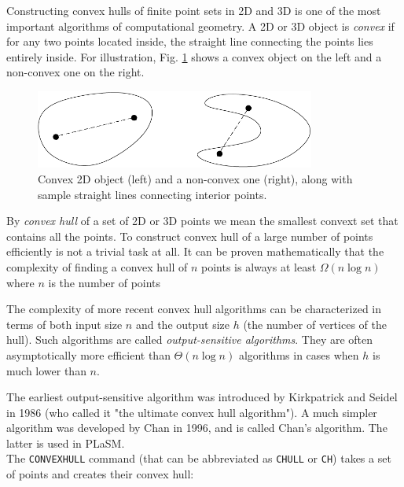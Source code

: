 Constructing convex hulls of finite point sets in 2D and 3D is one of the 
most important algorithms of computational geometry. A 2D or 3D object is {\em convex} if for any 
two points located inside, the straight line connecting the points 
lies entirely inside. For illustration, Fig. \ref{fig:convex} 
shows a convex object on the left and a non-convex one on the right.

\begin{figure}[!ht]
\begin{center}
\includegraphics[width=0.82\textwidth]{img/convex.pdf}
\end{center}
\vspace{-4mm}
\caption{Convex 2D object (left) and a non-convex one (right), along with 
         sample straight lines connecting interior points.}
\label{fig:convex}
\end{figure}
\noindent
By {\em convex hull} of a set of 2D or 3D points we mean the smallest convext 
set that contains all the points. To construct convex hull of a large number 
of points efficiently is not a trivial task at all. It can be proven 
mathematically that the complexity of finding a convex hull of $n$ points 
is always at least $Ω(n \log n)$ where $n$ is the number of points 
 
The complexity of more recent convex hull algorithms can be characterized 
in terms of both input size $n$ and the output size $h$ (the number of vertices
of the hull). Such algorithms are called {\em output-sensitive algorithms}. 
They are often asymptotically more efficient than $Θ(n \log n)$ algorithms 
in cases when $h$ is much lower than $n$. 

The earliest output-sensitive 
algorithm was introduced by Kirkpatrick and Seidel in 1986 (who 
called it "the ultimate convex hull algorithm"). A much simpler algorithm 
was developed by Chan in 1996, and is called Chan's algorithm. The latter
is used in PLaSM. \\

\noindent
The {\tt CONVEXHULL} command (that can be abbreviated as {\tt CHULL} or {\tt CH})
takes a set of points and creates their convex hull:\\


